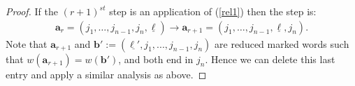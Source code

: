 \documentclass[11pt,reqno]{amsart}
\numberwithin{equation}{section}
\theoremstyle{definition}
\theoremstyle{named}
\newcommand{\ba}{\mathbf{a}}
\newcommand{\bb}{\mathbf{b}}
\newcommand{\ul}[1]{\underline{#1}}
\begin{document}
\begin{proof}
If  the $(r+1)^{st}$ step  is an application of (\ref{rel1}) then the step is:
\begin{align*}
\ba_r=(j_1,\hdots,j_{n-1},j_n,\ul{\ell}) \to \ba_{r+1}=(j_1,\hdots,j_{n-1},\ul{\ell},j_n).
\end{align*}
 Note that  $\ba_{r+1}$ and $\bb':=(\ul{\ell'},j_1,...,j_{n-1},j_n)$ are reduced marked words such that $w(\ba_{r+1})=w(\bb')$, and both end in $j_n$.  Hence we can delete this last entry and apply a similar analysis as above.

%
%
%
%
%
\end{proof}
\end{document}
